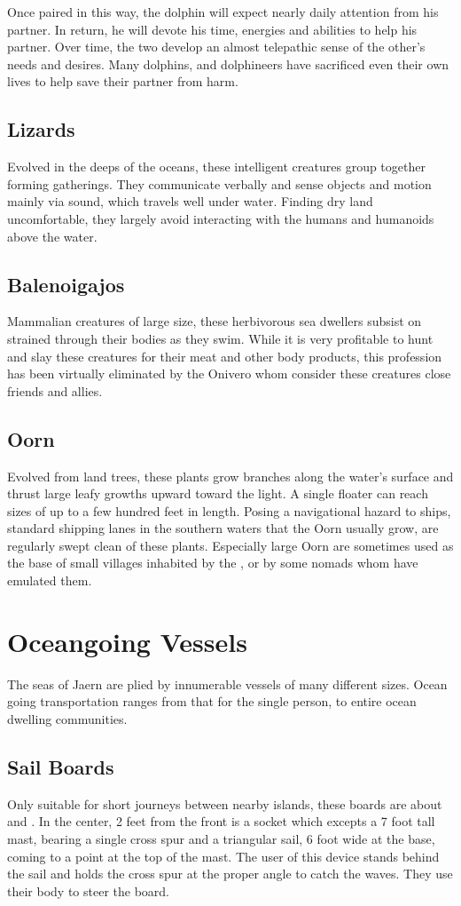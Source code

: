 \begin{multicols*}{2}
Once paired in this way, the dolphin will expect nearly daily attention from his partner. In return, he will devote his time, energies and abilities to help his partner. Over time, the two develop an almost telepathic sense of the other's needs and desires. Many dolphins, and dolphineers have sacrificed even their own lives to help save their partner from harm.
\subsection{Lizards}
Evolved in the deeps of the oceans, these intelligent creatures group together forming gatherings. They communicate verbally and sense objects and motion mainly via sound, which travels well under water. Finding dry land uncomfortable, they largely avoid interacting with the humans and humanoids above the water.
\subsection{Balenoigajos}
Mammalian creatures of large size, these  herbivorous sea dwellers subsist on  strained through their bodies as they swim. While it is very profitable to hunt
and slay these creatures for their meat and other body products, this profession has been virtually eliminated by the Onivero whom consider these creatures close friends and allies.
\subsection{Oorn}
Evolved from land trees, these plants grow branches along the water's surface and thrust large leafy growths upward toward the light. A single floater can reach sizes of up to a few hundred feet in length. Posing a  navigational hazard to ships, standard shipping lanes in the southern waters that the Oorn usually grow, are regularly swept clean of these plants. Especially large Oorn are sometimes used as the base of small villages inhabited by the , or by some nomads whom have emulated them.
\section{Oceangoing Vessels}
The seas of Jaern are plied by innumerable vessels of many different sizes. Ocean going transportation ranges from that for the single person, to entire ocean dwelling communities.
\subsection{Sail Boards}
Only suitable for short journeys between nearby islands, these boards are about  and . In the center, 2 feet from the front is a socket which excepts a 7 foot tall mast, bearing a single cross spur and a triangular sail, 6 foot wide at the base, coming to a point at the top of the mast. The user of this device stands behind the sail and holds the cross spur at the proper angle to catch the waves. They use their body to steer the board.


\end{multicols*}
